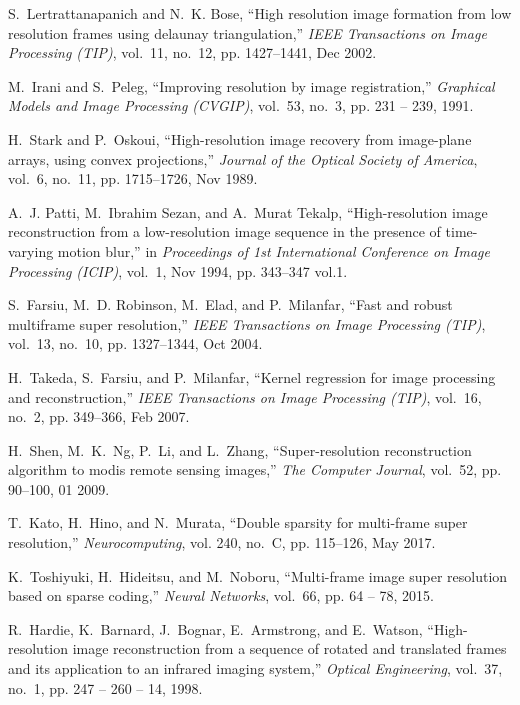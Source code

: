 \documentclass[journal]{IEEEtran}
\begin{document}
\begin{thebibliography}{10}
S.~{Lertrattanapanich} and N.~K. {Bose}, ``High resolution image formation from
  low resolution frames using delaunay triangulation,'' \emph{IEEE Transactions
  on Image Processing (TIP)}, vol.~11, no.~12, pp. 1427--1441, Dec 2002.

M.~Irani and S.~Peleg, ``Improving resolution by image registration,''
  \emph{Graphical Models and Image Processing (CVGIP)}, vol.~53, no.~3, pp. 231
  -- 239, 1991.

H.~Stark and P.~Oskoui, ``High-resolution image recovery from image-plane
  arrays, using convex projections,'' \emph{Journal of the Optical Society of
  America}, vol.~6, no.~11, pp. 1715--1726, Nov 1989.

A.~J. {Patti}, M.~{Ibrahim Sezan}, and A.~{Murat Tekalp}, ``High-resolution
  image reconstruction from a low-resolution image sequence in the presence of
  time-varying motion blur,'' in \emph{Proceedings of 1st International
  Conference on Image Processing (ICIP)}, vol.~1, Nov 1994, pp. 343--347 vol.1.

S.~{Farsiu}, M.~D. {Robinson}, M.~{Elad}, and P.~{Milanfar}, ``Fast and robust
  multiframe super resolution,'' \emph{IEEE Transactions on Image Processing
  (TIP)}, vol.~13, no.~10, pp. 1327--1344, Oct 2004.

H.~{Takeda}, S.~{Farsiu}, and P.~{Milanfar}, ``Kernel regression for image
  processing and reconstruction,'' \emph{IEEE Transactions on Image Processing
  (TIP)}, vol.~16, no.~2, pp. 349--366, Feb 2007.

H.~Shen, M.~K.~Ng, P.~Li, and L.~Zhang, ``Super-resolution reconstruction
  algorithm to modis remote sensing images,'' \emph{The Computer Journal},
  vol.~52, pp. 90--100, 01 2009.

T.~Kato, H.~Hino, and N.~Murata, ``Double sparsity for multi-frame super
  resolution,'' \emph{Neurocomputing}, vol. 240, no.~C, pp. 115--126, May 2017.

K.~Toshiyuki, H.~Hideitsu, and M.~Noboru, ``Multi-frame image super resolution
  based on sparse coding,'' \emph{Neural Networks}, vol.~66, pp. 64 -- 78,
  2015.

R.~Hardie, K.~Barnard, J.~Bognar, E.~Armstrong, and E.~Watson,
  ``High-resolution image reconstruction from a sequence of rotated and
  translated frames and its application to an infrared imaging system,''
  \emph{Optical Engineering}, vol.~37, no.~1, pp. 247 -- 260 -- 14, 1998.


\end{thebibliography}
\end{document}
